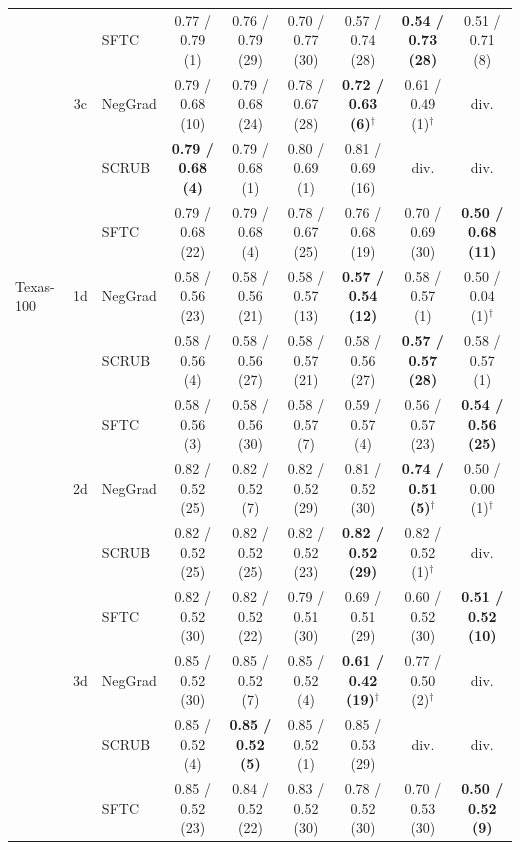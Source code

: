 \begin{table}[t]
{\begin{tabular}{l c l cccccc}
 &  & SFTC & 0.77 / 0.79 (1) & 0.76 / 0.79 (29) & 0.70 / 0.77 (30) & 0.57 / 0.74 (28) & \textbf{0.54 / 0.73 (28)} & 0.51 / 0.71 (8) \\
 & 3c & NegGrad & 0.79 / 0.68 (10) & 0.79 / 0.68 (24) & 0.78 / 0.67 (28) & \textbf{0.72 / 0.63 (6)$^{\dagger}$} & 0.61 / 0.49 (1)$^{\dagger}$ & div. \\
 &  & SCRUB & \textbf{0.79 / 0.68 (4)} & 0.79 / 0.68 (1) & 0.80 / 0.69 (1) & 0.81 / 0.69 (16) & div. & div. \\
 &  & SFTC & 0.79 / 0.68 (22) & 0.79 / 0.68 (4) & 0.78 / 0.67 (25) & 0.76 / 0.68 (19) & 0.70 / 0.69 (30) & \textbf{0.50 / 0.68 (11)} \\
\midrule
Texas-100 & 1d & NegGrad & 0.58 / 0.56 (23) & 0.58 / 0.56 (21) & 0.58 / 0.57 (13) & \textbf{0.57 / 0.54 (12)} & 0.58 / 0.57 (1) & 0.50 / 0.04 (1)$^{\dagger}$ \\
 &  & SCRUB & 0.58 / 0.56 (4) & 0.58 / 0.56 (27) & 0.58 / 0.57 (21) & 0.58 / 0.56 (27) & \textbf{0.57 / 0.57 (28)} & 0.58 / 0.57 (1) \\
 &  & SFTC & 0.58 / 0.56 (3) & 0.58 / 0.56 (30) & 0.58 / 0.57 (7) & 0.59 / 0.57 (4) & 0.56 / 0.57 (23) & \textbf{0.54 / 0.56 (25)} \\
 & 2d & NegGrad & 0.82 / 0.52 (25) & 0.82 / 0.52 (7) & 0.82 / 0.52 (29) & 0.81 / 0.52 (30) & \textbf{0.74 / 0.51 (5)$^{\dagger}$} & 0.50 / 0.00 (1)$^{\dagger}$ \\
 &  & SCRUB & 0.82 / 0.52 (25) & 0.82 / 0.52 (25) & 0.82 / 0.52 (23) & \textbf{0.82 / 0.52 (29)} & 0.82 / 0.52 (1)$^{\dagger}$ & div. \\
 &  & SFTC & 0.82 / 0.52 (30) & 0.82 / 0.52 (22) & 0.79 / 0.51 (30) & 0.69 / 0.51 (29) & 0.60 / 0.52 (30) & \textbf{0.51 / 0.52 (10)} \\
 & 3d & NegGrad & 0.85 / 0.52 (30) & 0.85 / 0.52 (7) & 0.85 / 0.52 (4) & \textbf{0.61 / 0.42 (19)$^{\dagger}$} & 0.77 / 0.50 (2)$^{\dagger}$ & div. \\
 &  & SCRUB & 0.85 / 0.52 (4) & \textbf{0.85 / 0.52 (5)} & 0.85 / 0.52 (1) & 0.85 / 0.53 (29) & div. & div. \\
 &  & SFTC & 0.85 / 0.52 (23) & 0.84 / 0.52 (22) & 0.83 / 0.52 (30) & 0.78 / 0.52 (30) & 0.70 / 0.53 (30) & \textbf{0.50 / 0.52 (9)} \\
\bottomrule
\end{tabular}}
\end{table}
